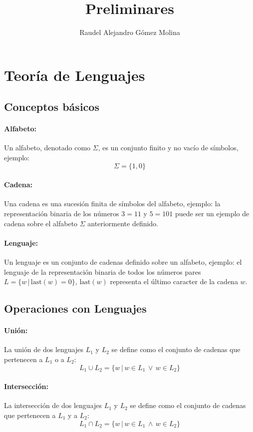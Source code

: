 \documentclass{article}
\title{Preliminares}
\author{Raudel Alejandro Gómez Molina}
\begin{document}
\maketitle

\section{Teoría de Lenguajes}


\subsection{Conceptos básicos}

\paragraph{Alfabeto:} Un alfabeto, denotado como $\Sigma$, es un conjunto finito y no vacío de símbolos, ejemplo:
$$\Sigma=\{1,0\}$$
\paragraph{Cadena:} Una cadena es una sucesión finita de símbolos del alfabeto, ejemplo: la representación binaria de
los números $3=11$ y $5=101$ puede ser un ejemplo de cadena sobre el alfabeto $\Sigma$ anteriormente
definido.
\paragraph{Lenguaje:} Un lenguaje es un conjunto de cadenas definido sobre un alfabeto, ejemplo: el lenguaje de la
representación binaria de todos los números pares $L=\{w\,|\,\text{last}(w)=0\}$, $\text{last}(w)$
representa el último caracter de la cadena $w$.

\subsection{Operaciones con Lenguajes}

\paragraph{Unión:} La unión de dos lenguajes $L_1$ y $L_2$ se define como el conjunto de cadenas que
pertenecen a $L_1$ o a $L_2$:
$$L_1\cup L_2=\{w\,|\,w\in L_1\,\vee\,w\in L_2\}$$
\paragraph{Intersección:} La intersección de dos lenguajes $L_1$ y $L_2$ se define como el conjunto de
cadenas que pertenecen a $L_1$ y a $L_2$:
$$L_1\cap L_2=\{w\,|\,w\in L_1\,\wedge\,w\in L_2\}$$
\end{document}

